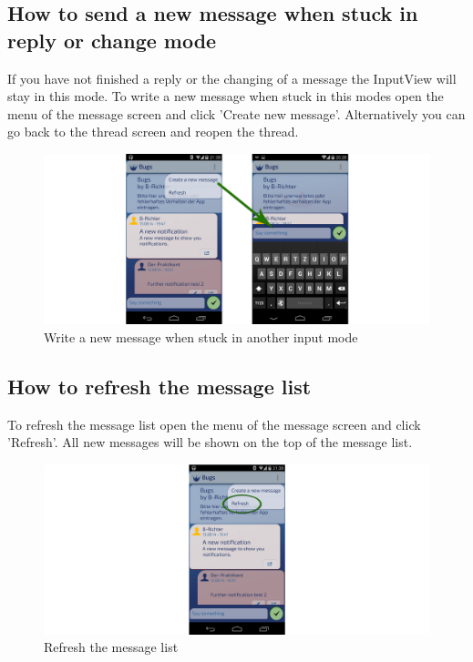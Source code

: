 \documentclass[12pt,a4paper,oneside]{report}
\begin{document}
\subsection{How to send a new message when stuck in reply or change mode}
If you have not finished a reply or the changing of a message the InputView will stay in this mode. To write a new message when stuck in this modes open the menu of the message screen and click 'Create new message'. Alternatively you can go back to the thread screen and reopen the thread.

\begin{figure}[!ht]
    \includegraphics[width=\linewidth]{WhenStuck.png}
    \caption{Write a new message when stuck in another input mode}
\end{figure}

\subsection{How to refresh the message list}
To refresh the message list open the menu of the message screen and click 'Refresh'. All new messages will be shown on the top of the message list.

\begin{figure}[!ht]
    \includegraphics[width=\linewidth]{RefreshMsg.png}
    \caption{Refresh the message list}
\end{figure}
\end{document}
